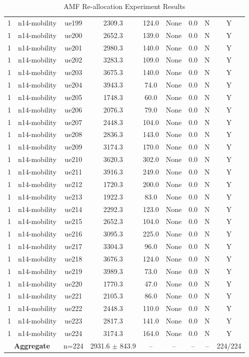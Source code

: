 \begin{table}[ht]
\begin{tabular}{|c|c|c|c|c|c|c|c|c|}
1 & n14-mobility & ue199 & 2309.3 & 124.0 & None & 0.0 & N & Y \\
1 & n14-mobility & ue200 & 2652.3 & 139.0 & None & 0.0 & N & Y \\
1 & n14-mobility & ue201 & 2980.3 & 140.0 & None & 0.0 & N & Y \\
1 & n14-mobility & ue202 & 3283.3 & 109.0 & None & 0.0 & N & Y \\
1 & n14-mobility & ue203 & 3675.3 & 140.0 & None & 0.0 & N & Y \\
1 & n14-mobility & ue204 & 3943.3 & 74.0 & None & 0.0 & N & Y \\
1 & n14-mobility & ue205 & 1748.3 & 60.0 & None & 0.0 & N & Y \\
1 & n14-mobility & ue206 & 2076.3 & 79.0 & None & 0.0 & N & Y \\
1 & n14-mobility & ue207 & 2448.3 & 104.0 & None & 0.0 & N & Y \\
1 & n14-mobility & ue208 & 2836.3 & 143.0 & None & 0.0 & N & Y \\
1 & n14-mobility & ue209 & 3174.3 & 170.0 & None & 0.0 & N & Y \\
1 & n14-mobility & ue210 & 3620.3 & 302.0 & None & 0.0 & N & Y \\
1 & n14-mobility & ue211 & 3916.3 & 249.0 & None & 0.0 & N & Y \\
1 & n14-mobility & ue212 & 1720.3 & 200.0 & None & 0.0 & N & Y \\
1 & n14-mobility & ue213 & 1922.3 & 83.0 & None & 0.0 & N & Y \\
1 & n14-mobility & ue214 & 2292.3 & 123.0 & None & 0.0 & N & Y \\
1 & n14-mobility & ue215 & 2652.3 & 104.0 & None & 0.0 & N & Y \\
1 & n14-mobility & ue216 & 3095.3 & 225.0 & None & 0.0 & N & Y \\
1 & n14-mobility & ue217 & 3304.3 & 96.0 & None & 0.0 & N & Y \\
1 & n14-mobility & ue218 & 3676.3 & 124.0 & None & 0.0 & N & Y \\
1 & n14-mobility & ue219 & 3989.3 & 73.0 & None & 0.0 & N & Y \\
1 & n14-mobility & ue220 & 1770.3 & 47.0 & None & 0.0 & N & Y \\
1 & n14-mobility & ue221 & 2105.3 & 86.0 & None & 0.0 & N & Y \\
1 & n14-mobility & ue222 & 2448.3 & 110.0 & None & 0.0 & N & Y \\
1 & n14-mobility & ue223 & 2817.3 & 141.0 & None & 0.0 & N & Y \\
1 & n14-mobility & ue224 & 3174.3 & 164.0 & None & 0.0 & N & Y \\
\multicolumn{2}{|c|}{\textbf{Aggregate}} & n=224 & 2931.6 $\pm$ 843.9 & -- & -- & -- & -- & 224/224 \\
\hline
\end{tabular}
\caption{AMF Re-allocation Experiment Results}
\label{tab:amf_realloc}
\end{table}
